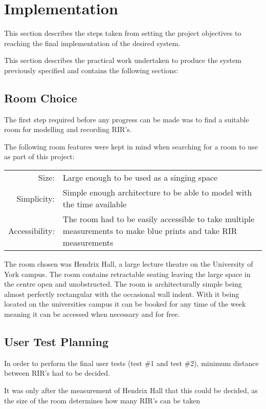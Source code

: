 \documentclass[../../main.tex]{subfiles}
\begin{document}
	\section{Implementation}
	This section describes the steps taken from setting the project objectives to reaching the final implementation of the desired system.

	This section describes the practical work undertaken to produce the system previously specified and contains the following sections:

	\subsection{Room Choice}
	\label{roomChoice}

		The first step required before any progress can be made was to find a suitable room for modelling and recording \ac{RIR}'s.

		The following room features were kept in mind when searching for a room to use as part of this project:
		\begin{center}
		\begin{tabular}{r p{12cm}}
			Size: & Large enough to be used as a singing space \\
			Simplicity: & Simple enough architecture to be able to model with the time available \\
			Accessibility: & The room had to be easily accessible to take  multiple measurements to make blue prints and take \ac{RIR} measurements
		\end{tabular}
		\end{center}

		The room chosen was Hendrix Hall, a large lecture theatre on the University of York campus. The room contains retractable seating leaving the large space in the centre open and unobstructed. The room is architecturally simple being almost perfectly rectangular with the occasional wall indent. With it being located on the universities campus it can be booked for any time of the week meaning it can be accessed when necessary and for free.

	\subsection{User Test Planning}
	\label{Background:RIRPositions}

		In order to perform the final user tests (test \#1 and test \#2), minimum distance between \ac{RIR}'s had to be decided.

		It was only after the measurement of Hendrix Hall that this could be decided, as the size of the room determines how many \ac{RIR}'s can be taken
\end{document}

